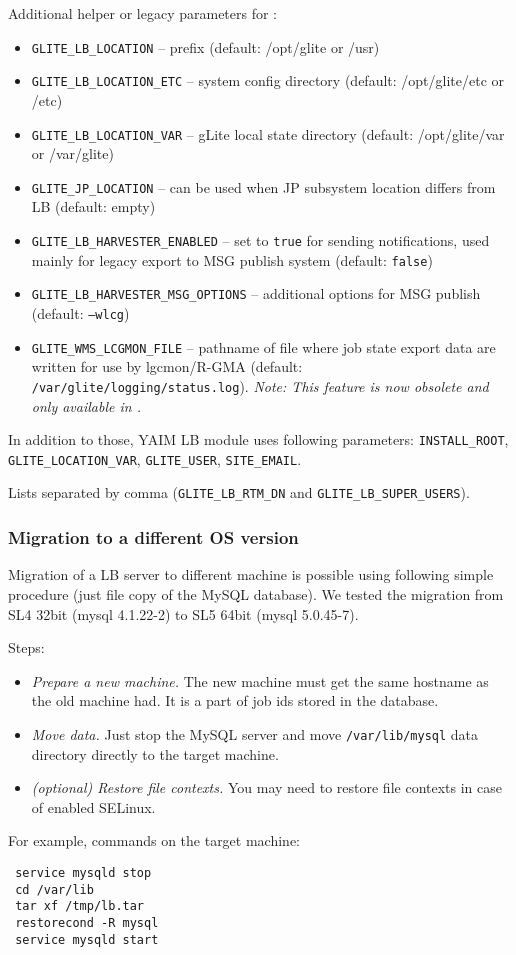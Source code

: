 Additional helper or legacy parameters for \LB:
\begin{itemize}
\item \texttt{GLITE\_LB\_LOCATION} -- \LB prefix (default: /opt/glite or /usr)
\item \texttt{GLITE\_LB\_LOCATION\_ETC} -- system config directory (default: /opt/glite/etc or /etc)
\item \texttt{GLITE\_LB\_LOCATION\_VAR} -- gLite local state directory (default: /opt/glite/var or /var/glite)
\item \texttt{GLITE\_JP\_LOCATION} -- can be used when JP subsystem location differs from LB (default: empty)
\item \texttt{GLITE\_LB\_HARVESTER\_ENABLED} -- set to \texttt{true} for sending notifications, used mainly for legacy export to MSG publish system (default: \texttt{false})
\item \texttt{GLITE\_LB\_HARVESTER\_MSG\_OPTIONS} -- additional options for MSG publish (default: \texttt{--wlcg})
\item \texttt{GLITE\_WMS\_LCGMON\_FILE} -- pathname of file where job state
export data are written for use by lgcmon/R-GMA 
(default: \texttt{/var/glite/logging/status.log}). \emph{Note: This feature is now obsolete and only available in .}
\end{itemize}

In addition to those, YAIM LB module uses following parameters:
\texttt{INSTALL\_ROOT}, \texttt{GLITE\_LOCATION\_VAR}, \texttt{GLITE\_USER}, \texttt{SITE\_EMAIL}.

Lists separated by comma (\texttt{GLITE\_LB\_RTM\_DN} and \texttt{GLITE\_LB\_SUPER\_USERS}).

\subsubsection{Migration to a different OS version}
\label{inst:OSmigration}
Migration of a LB server to different machine is possible using
following simple procedure (just file copy of the MySQL database). We
tested the migration from SL4 32bit (mysql 4.1.22-2) to SL5 64bit
(mysql 5.0.45-7).

Steps:
\begin{itemize}
\item \emph{Prepare a new machine.} The new machine must get the same hostname 
 as the old machine had. It is a part of job ids stored in the database.
\item \emph{Move data.} Just stop the MySQL server and move
 \verb'/var/lib/mysql' data directory directly to the target machine.
\item \emph{(optional) Restore file contexts.} You may need to restore file 
 contexts in case of enabled SELinux.
\end{itemize}
For example, commands on the target machine:
 \begin{verbatim}
 service mysqld stop
 cd /var/lib
 tar xf /tmp/lb.tar
 restorecond -R mysql
 service mysqld start
 \end{verbatim}

